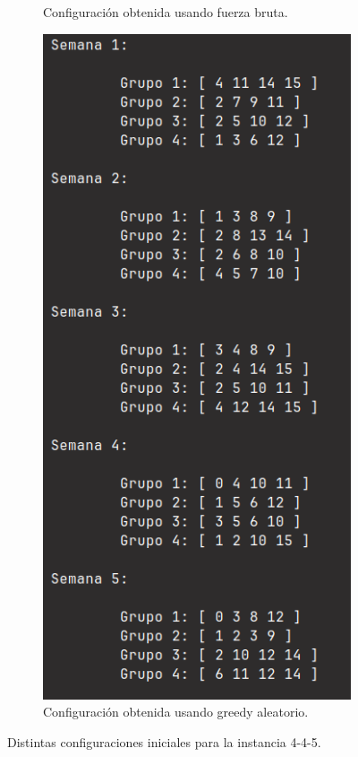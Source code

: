 \documentclass[letter, 10pt]{article}
\begin{document}
\begin{figure}[h]
\begin{subfigure}[b]{0.3\textwidth}
        \caption{Configuración obtenida usando fuerza bruta.}
        \label{fig:bruteforce}
    \end{subfigure}
    \hspace{0.5mm}
    \begin{subfigure}[b]{0.3\textwidth}
        \centering
        \includegraphics[width=\textwidth]{figures/greedy_random.png}
        \caption{Configuración obtenida usando greedy aleatorio.}
        \label{fig:randgr}
    \end{subfigure}

    \caption{Distintas configuraciones iniciales para la instancia 4-4-5.}
    \label{fig:greedys}
\end{figure}
\end{document}
